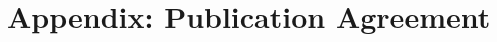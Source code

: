 \documentclass[12pt]{article}
\begin{document}
\doublespacing
\appendix


\section{Appendix: Publication Agreement}\label{appendixlabel}

\end{document}
